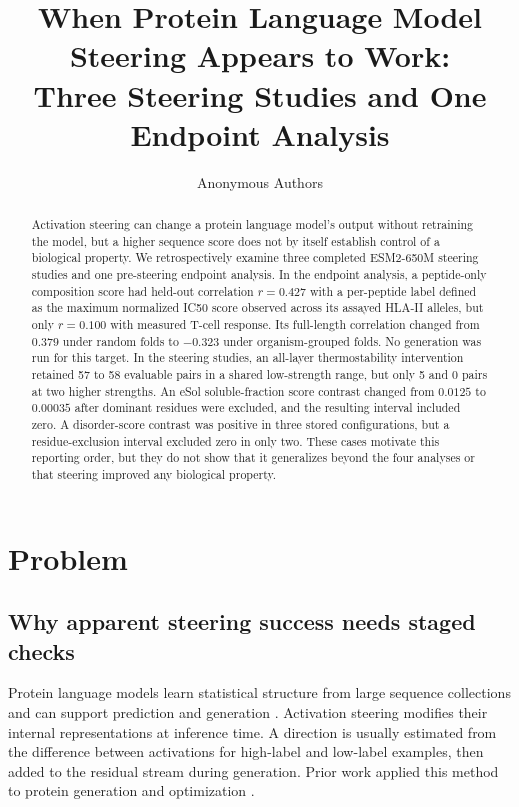 \documentclass{article}
\title{When Protein Language Model Steering Appears to Work: \\
Three Steering Studies and One Endpoint Analysis}
\author{Anonymous Authors}
\begin{document}
\maketitle

\begin{abstract}
Activation steering can change a protein language model's output without
retraining the model, but a higher sequence score does not by itself establish
control of a biological property. We retrospectively examine three completed
ESM2-650M steering studies and one pre-steering endpoint analysis. In the
endpoint analysis, a peptide-only composition score had held-out correlation
$r=0.427$ with a per-peptide label defined as the maximum normalized IC50
score observed across its assayed HLA-II alleles, but only $r=0.100$ with
measured T-cell response. Its full-length correlation changed from $0.379$
under random folds to $-0.323$ under organism-grouped folds. No generation was
run for this target. In the steering studies, an all-layer thermostability
intervention retained 57 to 58 evaluable pairs in a shared low-strength range,
but only 5 and 0 pairs at two higher strengths. An eSol soluble-fraction score
contrast changed from $0.0125$ to $0.00035$ after dominant residues were
excluded, and the resulting interval included zero. A disorder-score contrast
was positive in three stored configurations, but a residue-exclusion interval
excluded zero in only two. These cases motivate this reporting order, but they
do not show that it generalizes beyond the four analyses or that steering
improved any biological property.
\end{abstract}

\section{Problem}
\label{sec:problem}

\subsection{Why apparent steering success needs staged checks}

Protein language models learn statistical structure from large sequence
collections and can support prediction and generation
\citep{lin2023esm}. Activation steering modifies their internal
representations at inference time. A direction is usually estimated from the
difference between activations for high-label and low-label examples, then
added to the residual stream during generation. Prior work applied this
method to protein generation and optimization \citep{huang2025steering}.
\end{document}
